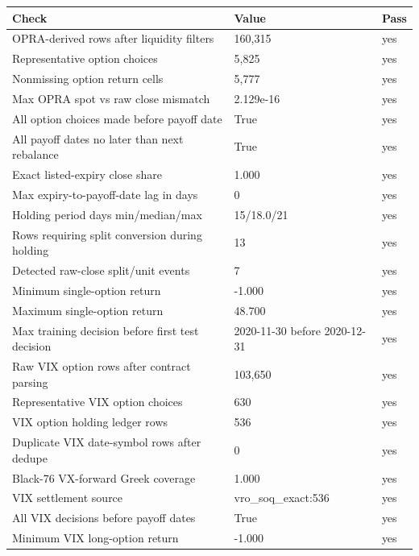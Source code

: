 \begin{tabular}{lll}
\toprule
Check & Value & Pass \\
\midrule
OPRA-derived rows after liquidity filters & 160,315 & yes \\
Representative option choices & 5,825 & yes \\
Nonmissing option return cells & 5,777 & yes \\
Max OPRA spot vs raw close mismatch & 2.129e-16 & yes \\
All option choices made before payoff date & True & yes \\
All payoff dates no later than next rebalance & True & yes \\
Exact listed-expiry close share & 1.000 & yes \\
Max expiry-to-payoff-date lag in days & 0 & yes \\
Holding period days min/median/max & 15/18.0/21 & yes \\
Rows requiring split conversion during holding & 13 & yes \\
Detected raw-close split/unit events & 7 & yes \\
Minimum single-option return & -1.000 & yes \\
Maximum single-option return & 48.700 & yes \\
Max training decision before first test decision & 2020-11-30 before 2020-12-31 & yes \\
Raw VIX option rows after contract parsing & 103,650 & yes \\
Representative VIX option choices & 630 & yes \\
VIX option holding ledger rows & 536 & yes \\
Duplicate VIX date-symbol rows after dedupe & 0 & yes \\
Black-76 VX-forward Greek coverage & 1.000 & yes \\
VIX settlement source & vro\_soq\_exact:536 & yes \\
All VIX decisions before payoff dates & True & yes \\
Minimum VIX long-option return & -1.000 & yes \\
\bottomrule
\end{tabular}
